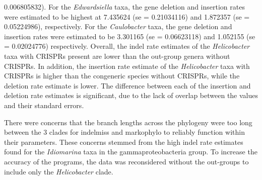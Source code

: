 \documentclass[english]{article}
\begin{document}
0.006805832). For the \textit{Edwardsiella} taxa, the gene deletion and
insertion rates were estimated to be highest at 7.435624 (se =
0.21034116) and 1.872357 (se = 0.05224986), respectively. For the
\textit{Caulobacter} taxa, the gene deletion and insertion rates 
were estimated
to be 3.301165 (se = 0.06623118) and 1.052155 (se = 0.02024776)
respectively. Overall, the indel rate estimates of the
\textit{Helicobacter}
taxa with CRISPRs present are lower than the out-group genera without
CRISPRs. In addition, the insertion rate estimate of the
\textit{Helicobacter}
taxa with CRISPRs is higher than the congeneric species without
CRISPRs, while the deletion rate estimate is lower. The difference 
between each of the insertion and
deletion rate  estimates  is significant,  due to the
lack of overlap between the  values and their standard errors. 

There were concerns that the branch  lengths  across  the  phylogeny
were too long  between  the  3 clades for indelmiss and markophylo  to
reliably  function  within  their parameters. These concerns stemmed
from the high indel rate estimates found for the \textit{Idiomarina}
taxa in the gammaproteobacteria group. To increase the accuracy
of the programs, the data was reconsidered without the out-groups to
include only the \textit{Helicobacter} clade.
\end{document}
